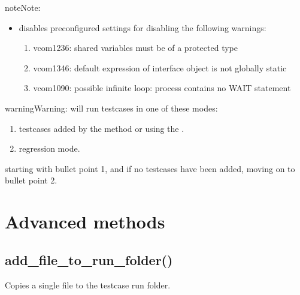 \documentclass[letterpaper,10pt,english]{sphinxmanual}
\begin{document}
\begin{sphinxadmonition}{note}{Note:}
\begin{itemize}
\item {} 
\sphinxAtStartPar
{} disables preconfigured settings for disabling the following warnings:
\begin{enumerate}
%
\item {} 
\sphinxAtStartPar
vcom\sphinxhyphen{}1236: shared variables must be of a protected type

\item {} 
\sphinxAtStartPar
vcom\sphinxhyphen{}1346: default expression of interface object is not globally static

\item {} 
\sphinxAtStartPar
vcom\sphinxhyphen{}1090: possible infinite loop: process contains no WAIT statement

\end{enumerate}

\end{itemize}
\end{sphinxadmonition}

\begin{sphinxadmonition}{warning}{Warning:}
\sphinxAtStartPar
{} will run testcases in one of these modes:
\begin{enumerate}
%
\item {} 
\sphinxAtStartPar
testcases added by the {\hyperref[\detokenize{api:add-testcase}]{}} method or using the {\hyperref[\detokenize{cli::doc}]{}}.

\item {} 
\sphinxAtStartPar
regression mode.

\end{enumerate}

\sphinxAtStartPar
starting with bullet point 1, and if no testcases have been added, moving on to bullet point 2.
\end{sphinxadmonition}


\section{Advanced methods}
\label{\detokenize{api:advanced-methods}}

\subsection{add\_file\_to\_run\_folder()}
\label{\detokenize{api:add-file-to-run-folder}}
\sphinxAtStartPar
Copies a single file to the testcase run folder.
\end{document}
